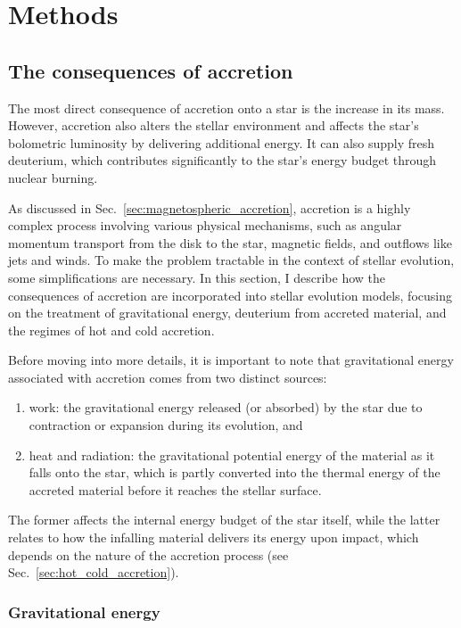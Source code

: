 \documentclass[12pt,a4paper]{article}
\begin{document}
\section{Methods}
\label{sec:methods}

\subsection{The consequences of accretion}
\label{sec:accretion_modeling}

The most direct consequence of accretion onto a star is the increase in its mass. However, accretion also alters the stellar environment and affects the star's bolometric luminosity by delivering additional energy. It can also supply fresh deuterium, which contributes significantly to the star's energy budget through nuclear burning.

As discussed in Sec.~\ref{sec:magnetospheric_accretion}, accretion is a highly complex process involving various physical mechanisms, such as angular momentum transport from the disk to the star, magnetic fields, and outflows like jets and winds. To make the problem tractable in the context of stellar evolution, some simplifications are necessary. In this section, I describe how the consequences of accretion are incorporated into stellar evolution models, focusing on the treatment of gravitational energy, deuterium from accreted material, and the regimes of hot and cold accretion.

Before moving into more details, it is important to note that gravitational energy associated with accretion comes from two distinct sources:
\begin{enumerate}
  \item work: the gravitational energy released (or absorbed) by the star due to contraction or expansion during its evolution, and
	\item heat and radiation: the gravitational potential energy of the material as it falls onto the star, which is partly converted into the thermal energy of the accreted material before it reaches the stellar surface.
\end{enumerate}

The former affects the internal energy budget of the star itself, while the latter relates to how the infalling material delivers its energy upon impact, which depends on the nature of the accretion process (see Sec.~\ref{sec:hot_cold_accretion}).

\subsubsection{Gravitational energy}
\label{sec:grav_energy}
\end{document}
